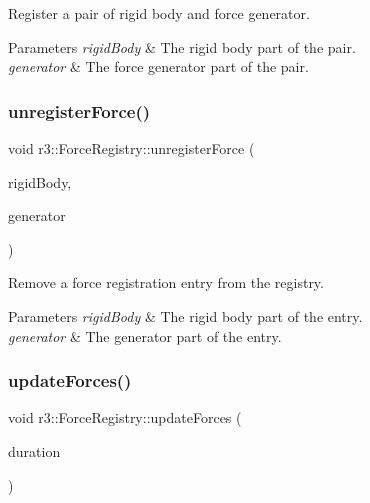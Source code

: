Register a pair of rigid body and force generator. 


\begin{DoxyParams}{Parameters}
{\em rigid\+Body} & The rigid body part of the pair. \\
\hline
{\em generator} & The force generator part of the pair. \\
\hline
\end{DoxyParams}
\mbox{\label{classr3_1_1_force_registry_a8fcc46a35435ffb74c471a0a5ff36a7f}} 
\subsubsection{\texorpdfstring{unregister\+Force()}{unregisterForce()}}
{\footnotesize\ttfamily void r3\+::\+Force\+Registry\+::unregister\+Force (\begin{DoxyParamCaption}\item[{\mbox{\hyperlink{classr3_1_1_rigid_body}{Rigid\+Body}} $\ast$}]{rigid\+Body,  }\item[{\mbox{\hyperlink{classr3_1_1_force_generator}{Force\+Generator}} $\ast$}]{generator }\end{DoxyParamCaption})}



Remove a force registration entry from the registry. 


\begin{DoxyParams}{Parameters}
{\em rigid\+Body} & The rigid body part of the entry. \\
\hline
{\em generator} & The generator part of the entry. \\
\hline
\end{DoxyParams}
\mbox{\label{classr3_1_1_force_registry_a34d6ad7472e2f47dfd3416a703eca78e}} 
\subsubsection{\texorpdfstring{update\+Forces()}{updateForces()}}
{\footnotesize\ttfamily void r3\+::\+Force\+Registry\+::update\+Forces (\begin{DoxyParamCaption}\item[{\mbox{\hyperlink{namespacer3_ab2016b3e3f743fb735afce242f0dc1eb}{real}}}]{duration }\end{DoxyParamCaption})}




